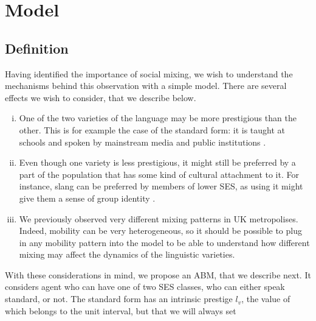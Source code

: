 \documentclass[../thesis.tex]{subfiles}
\begin{document}
\section{Model}

\subsection{Definition}
Having identified the importance of social mixing, we wish to understand the mechanisms
behind this observation with a simple model.
There are several effects we wish to
consider, that we describe below.
\begin{enumerate}[(i)]
  \item One of the two varieties of the language may be more prestigious than the other.
  This is for example the case of the standard form: it is taught at schools and spoken
  by mainstream media and public institutions \cite{DavilaInevitabilityStandard2016}.
  \item Even though one variety is less prestigious, it might still be preferred by a
  part of the population that has some kind of cultural attachment to it. For instance,
  slang can be preferred by members of lower \ac{SES}, as using it might give them a
  sense of group identity
  \cite{LabovSocialStratification1966,TrudgillSocialDifferentiation1974}.
  \item We previously observed very different mixing patterns in UK metropolises.
  Indeed, mobility can be very heterogeneous, so it should be possible to plug in any
  mobility pattern into the model to be able to understand how different mixing may
  affect the dynamics of the linguistic varieties.
\end{enumerate}
With these considerations in mind, we propose an \ac{ABM}, that we describe next. It
considers agent who can have one of two \ac{SES} classes,
who can either speak standard, or not. The standard form has an intrinsic prestige
$l_v$, the value of which belongs to the unit interval, but that we will always set
\end{document}
